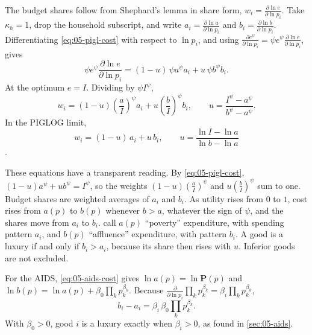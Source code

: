 The budget shares follow from Shephard's lemma in share form, $w_i = \frac{\partial \ln e}{\partial \ln
p_i}$. Take $\kappa_h = 1$, drop the household subscript, and write $a_i = \frac{\partial \ln a}{\partial
\ln p_i}$ and $b_i = \frac{\partial \ln b}{\partial \ln p_i}$. Differentiating \eqref{eq:05-pigl-cost}
with respect to $\ln p_i$, and using $\frac{\partial e^{\psi}}{\partial \ln p_i} = \psi e^{\psi}
\frac{\partial \ln e}{\partial \ln p_i}$, gives
\begin{equation*}
  \psi e^{\psi}\frac{\partial \ln e}{\partial \ln p_i} = (1 - u)\,\psi a^{\psi} a_i + u\, \psi b^{\psi} b_i .
\end{equation*}
At the optimum $e = I$. Dividing by $\psi I^{\psi}$,
\begin{equation}\label{eq:05-pigl-shares}
  w_i = (1 - u)\left(\frac{a}{I}\right)^{\psi} a_i + u\left(\frac{b}{I}\right)^{\psi} b_i,
  \qquad u = \frac{I^{\psi} - a^{\psi}}{b^{\psi} - a^{\psi}} .
\end{equation}
In the PIGLOG limit,
\begin{equation}\label{eq:05-piglog-shares}
  w_i = (1 - u)\, a_i + u\, b_i, \qquad u = \frac{\ln I - \ln a}{\ln b - \ln a}
\end{equation}
\citep[eqs.~A8--A10]{DeatonMuellbauer1980a}.

These equations have a transparent reading. By \eqref{eq:05-pigl-cost}, $(1-u)a^{\psi} + ub^{\psi} =
I^{\psi}$, so the weights $(1-u)(\frac{a}{I})^{\psi}$ and $u(\frac{b}{I})^{\psi}$ sum to one. Budget
shares are weighted averages of $a_i$ and $b_i$. As utility rises from $0$ to $1$, cost rises from $a(p)$
to $b(p)$ whenever $b > a$, whatever the sign of $\psi$, and the shares move from $a_i$ to $b_i$.
\citet{DeatonMuellbauer1980a} call $a(p)$ ``poverty'' expenditure, with spending pattern $a_i$, and $b(p)$
``affluence'' expenditure, with pattern $b_i$. A good is a luxury if and only if $b_i > a_i$, because its
share then rises with $u$. Inferior goods are not excluded.

For the AIDS, \eqref{eq:05-aids-cost} gives $\ln a(p) = \ln\mathbf{P}(p)$ and $\ln b(p) = \ln a(p) +
\beta_0\prod_k p_k^{\beta_k}$. Because $\frac{\partial}{\partial \ln p_i}\prod_k p_k^{\beta_k} = \beta_i
\prod_k p_k^{\beta_k}$,
\begin{equation*}
  b_i - a_i = \beta_i\, \beta_0 \prod_k p_k^{\beta_k}.
\end{equation*}
With $\beta_0 > 0$, good $i$ is a luxury exactly when $\beta_i > 0$, as found in \cref{sec:05-aids}.

